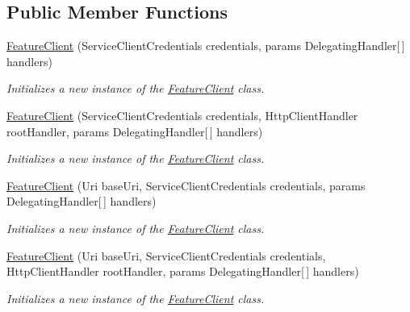 \subsection*{Public Member Functions}
\begin{DoxyCompactItemize}
\item 
\hyperlink{class_microsoft_1_1_azure_1_1_management_1_1_resources_1_1_feature_client_a42702546153fd199d8e0d872900f53ea}{Feature\+Client} (Service\+Client\+Credentials credentials, params Delegating\+Handler\mbox{[}$\,$\mbox{]} handlers)
\begin{DoxyCompactList}\small\item\em Initializes a new instance of the \hyperlink{class_microsoft_1_1_azure_1_1_management_1_1_resources_1_1_feature_client}{Feature\+Client} class. \end{DoxyCompactList}\item 
\hyperlink{class_microsoft_1_1_azure_1_1_management_1_1_resources_1_1_feature_client_a9e2c0febf863ca5ecaaa3b456b90aea8}{Feature\+Client} (Service\+Client\+Credentials credentials, Http\+Client\+Handler root\+Handler, params Delegating\+Handler\mbox{[}$\,$\mbox{]} handlers)
\begin{DoxyCompactList}\small\item\em Initializes a new instance of the \hyperlink{class_microsoft_1_1_azure_1_1_management_1_1_resources_1_1_feature_client}{Feature\+Client} class. \end{DoxyCompactList}\item 
\hyperlink{class_microsoft_1_1_azure_1_1_management_1_1_resources_1_1_feature_client_a49828cd8b5c2c87d5ead7916d86ae850}{Feature\+Client} (Uri base\+Uri, Service\+Client\+Credentials credentials, params Delegating\+Handler\mbox{[}$\,$\mbox{]} handlers)
\begin{DoxyCompactList}\small\item\em Initializes a new instance of the \hyperlink{class_microsoft_1_1_azure_1_1_management_1_1_resources_1_1_feature_client}{Feature\+Client} class. \end{DoxyCompactList}\item 
\hyperlink{class_microsoft_1_1_azure_1_1_management_1_1_resources_1_1_feature_client_a5d277cb1b740af70ab807a1cc53cfb17}{Feature\+Client} (Uri base\+Uri, Service\+Client\+Credentials credentials, Http\+Client\+Handler root\+Handler, params Delegating\+Handler\mbox{[}$\,$\mbox{]} handlers)
\begin{DoxyCompactList}\small\item\em Initializes a new instance of the \hyperlink{class_microsoft_1_1_azure_1_1_management_1_1_resources_1_1_feature_client}{Feature\+Client} class. \end{DoxyCompactList}\end{DoxyCompactItemize}
